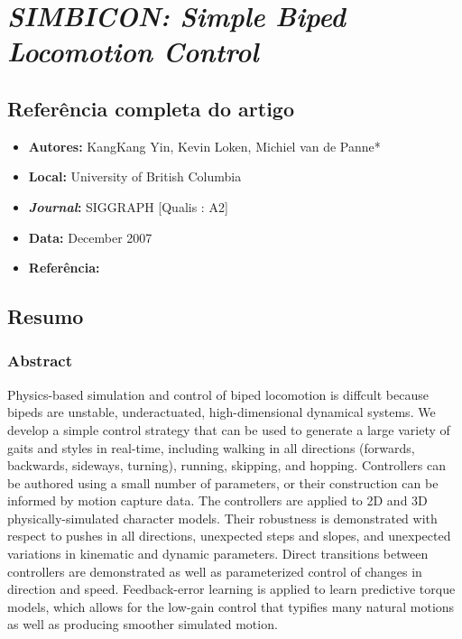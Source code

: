 \section{\textit{SIMBICON: Simple Biped Locomotion Control}}

\subsection{Referência completa do artigo}

\begin{itemize}
  \item \textbf{Autores:} KangKang Yin, Kevin Loken, Michiel van de Panne*
  \item \textbf{Local:} University of British Columbia
  \item \textbf{\textit{Journal}:} SIGGRAPH [Qualis : A2]
  \item \textbf{Data:} December 2007
  \item \textbf{Referência:} 
\end{itemize}


\subsection{Resumo}

\subsubsection{Abstract}
Physics-based simulation and control of biped locomotion is diffcult because bipeds are unstable, underactuated, high-dimensional dynamical systems. We develop a simple control strategy that can be used to generate a large variety of gaits and styles in real-time, including walking in all directions (forwards, backwards, sideways, turning), running, skipping, and hopping. Controllers can be authored using a small number of parameters, or their construction can be informed by motion capture data. The controllers are applied to 2D and 3D physically-simulated character models. Their robustness is demonstrated with respect to pushes in all directions, unexpected steps and slopes, and unexpected variations in kinematic and dynamic parameters. Direct transitions between controllers are demonstrated as well as parameterized control of changes in direction and speed. Feedback-error learning is applied to learn predictive torque models, which allows for the low-gain control that typifies many natural motions as well as producing smoother simulated motion.
